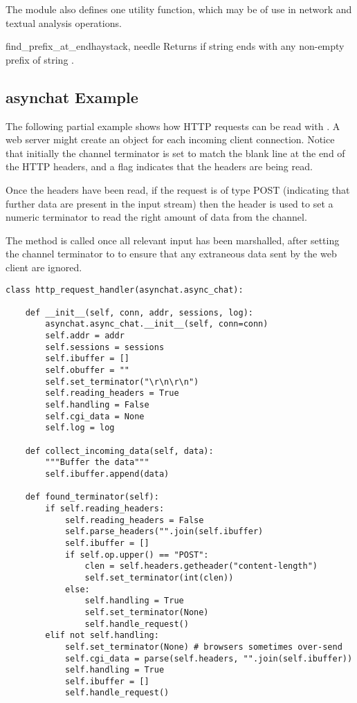 The  module also defines one utility function, which may be
of use in network and textual analysis operations.

\begin{funcdesc}{find_prefix_at_end}{haystack, needle}
  Returns  if string  ends with any non-empty
  prefix of string .
\end{funcdesc}

\subsection{asynchat Example \label{asynchat-example}}

The following partial example shows how HTTP requests can be read with
. A web server might create an  object for
each incoming client connection. Notice that initially the
channel terminator is set to match the blank line at the end of the HTTP
headers, and a flag indicates that the headers are being read.

Once the headers have been read, if the request is of type POST
(indicating that further data are present in the input stream) then the
 header is used to set a numeric terminator to
read the right amount of data from the channel.

The  method is called once all relevant input
has been marshalled, after setting the channel terminator to 
to ensure that any extraneous data sent by the web client are ignored.

\begin{verbatim}
class http_request_handler(asynchat.async_chat):

    def __init__(self, conn, addr, sessions, log):
        asynchat.async_chat.__init__(self, conn=conn)
        self.addr = addr
        self.sessions = sessions
        self.ibuffer = []
        self.obuffer = ""
        self.set_terminator("\r\n\r\n")
        self.reading_headers = True
        self.handling = False
        self.cgi_data = None
        self.log = log

    def collect_incoming_data(self, data):
        """Buffer the data"""
        self.ibuffer.append(data)

    def found_terminator(self):
        if self.reading_headers:
            self.reading_headers = False
            self.parse_headers("".join(self.ibuffer)
            self.ibuffer = []
            if self.op.upper() == "POST":
                clen = self.headers.getheader("content-length")
                self.set_terminator(int(clen))
            else:
                self.handling = True
                self.set_terminator(None)
                self.handle_request()
        elif not self.handling:
            self.set_terminator(None) # browsers sometimes over-send
            self.cgi_data = parse(self.headers, "".join(self.ibuffer))
            self.handling = True
            self.ibuffer = []
            self.handle_request()
\end{verbatim}

